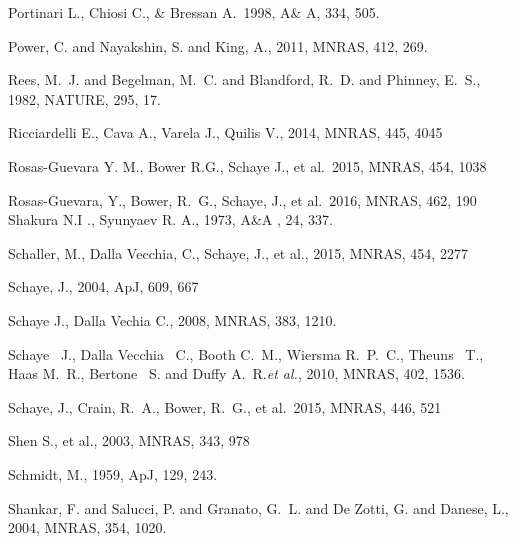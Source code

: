 \documentclass[a4paper,fleqn,usenatbib,letter]{mnras}
\begin{document}
\begin{thebibliography}{99}
Portinari L., Chiosi C., \& Bressan A.\ 1998, A\& A, 334, 505.  


 Power, C. and
Nayakshin, S. and King, A., 2011, MNRAS, 412, 269.


Rees, M.~J. and Begelman, M.~C. and Blandford, R.~D. and 
Phinney, E.~S., 1982, NATURE, 295, 17.

 Ricciardelli E., Cava A., Varela J., Quilis V., 2014, MNRAS, 445, 4045


Rosas-Guevara Y. M., Bower R.G., Schaye J., et al.\ 2015, MNRAS, 454, 1038 

Rosas-Guevara, Y., Bower, R.~G., Schaye, J., et al.\ 2016, MNRAS, 462, 190
Shakura N.I ., Syunyaev R. A., 1973, A\&A , 24, 337.

Schaller, M., Dalla Vecchia, C., Schaye, J., et al., 2015, MNRAS, 454, 2277


Schaye, J., 2004, ApJ, 609, 667 


Schaye J., Dalla Vechia C., 2008, MNRAS, 383, 1210.

Schaye ~J., Dalla Vecchia ~C., Booth C.~M., Wiersma R.~P.~C., Theuns ~T., Haas M.~R., Bertone ~S. and Duffy A.~R.{\it et al.},
 2010, MNRAS, 402, 1536. 


Schaye, J., Crain, R.~A., Bower, R.~G., et al.\ 2015, MNRAS, 446, 521 

Shen S., et al., 2003, MNRAS, 343, 978


Schmidt, M., 1959, ApJ, 129, 243.

 

{Shankar}, F. and {Salucci}, P. and {Granato}, G.~L. and {De Zotti}, G. and 
{Danese}, L., 2004, MNRAS, 354, 1020.



\end{thebibliography}
\end{document}
